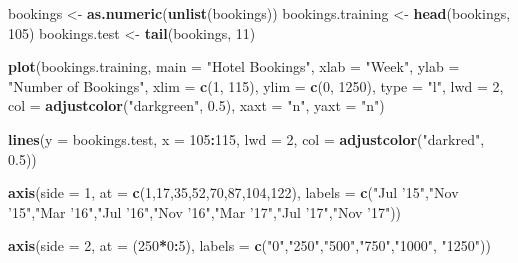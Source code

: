 \documentclass[]{article}
\newenvironment{Shaded}{\begin{snugshade}}{\end{snugshade}}
\newcommand{\DataTypeTok}[1]{\textcolor[rgb]{0.13,0.29,0.53}{#1}}
\newcommand{\DecValTok}[1]{\textcolor[rgb]{0.00,0.00,0.81}{#1}}
\newcommand{\FloatTok}[1]{\textcolor[rgb]{0.00,0.00,0.81}{#1}}
\newcommand{\KeywordTok}[1]{\textcolor[rgb]{0.13,0.29,0.53}{\textbf{#1}}}
\newcommand{\NormalTok}[1]{#1}
\newcommand{\OperatorTok}[1]{\textcolor[rgb]{0.81,0.36,0.00}{\textbf{#1}}}
\newcommand{\StringTok}[1]{\textcolor[rgb]{0.31,0.60,0.02}{#1}}
\begin{document}
\begin{Shaded}
\begin{Highlighting}[]
\NormalTok{bookings <-}\StringTok{ }\KeywordTok{as.numeric}\NormalTok{(}\KeywordTok{unlist}\NormalTok{(bookings))}
\NormalTok{bookings.training <-}\StringTok{ }\KeywordTok{head}\NormalTok{(bookings, }\DecValTok{105}\NormalTok{)}
\NormalTok{bookings.test <-}\StringTok{ }\KeywordTok{tail}\NormalTok{(bookings, }\DecValTok{11}\NormalTok{)}

\KeywordTok{plot}\NormalTok{(bookings.training,}
     \DataTypeTok{main =} \StringTok{"Hotel Bookings"}\NormalTok{,}
     \DataTypeTok{xlab =} \StringTok{"Week"}\NormalTok{,}
     \DataTypeTok{ylab =} \StringTok{"Number of Bookings"}\NormalTok{,}
     \DataTypeTok{xlim =} \KeywordTok{c}\NormalTok{(}\DecValTok{1}\NormalTok{, }\DecValTok{115}\NormalTok{),}
     \DataTypeTok{ylim =} \KeywordTok{c}\NormalTok{(}\DecValTok{0}\NormalTok{, }\DecValTok{1250}\NormalTok{),}
     \DataTypeTok{type =} \StringTok{"l"}\NormalTok{,}
     \DataTypeTok{lwd =} \DecValTok{2}\NormalTok{,}
     \DataTypeTok{col =} \KeywordTok{adjustcolor}\NormalTok{(}\StringTok{"darkgreen"}\NormalTok{, }\FloatTok{0.5}\NormalTok{),}
     \DataTypeTok{xaxt =} \StringTok{"n"}\NormalTok{,}
     \DataTypeTok{yaxt =} \StringTok{"n"}\NormalTok{)}

\KeywordTok{lines}\NormalTok{(}\DataTypeTok{y =}\NormalTok{ bookings.test,}
      \DataTypeTok{x =} \DecValTok{105}\OperatorTok{:}\DecValTok{115}\NormalTok{,}
      \DataTypeTok{lwd =} \DecValTok{2}\NormalTok{,}
      \DataTypeTok{col =} \KeywordTok{adjustcolor}\NormalTok{(}\StringTok{"darkred"}\NormalTok{, }\FloatTok{0.5}\NormalTok{))}

\KeywordTok{axis}\NormalTok{(}\DataTypeTok{side =} \DecValTok{1}\NormalTok{, }\DataTypeTok{at =} \KeywordTok{c}\NormalTok{(}\DecValTok{1}\NormalTok{,}\DecValTok{17}\NormalTok{,}\DecValTok{35}\NormalTok{,}\DecValTok{52}\NormalTok{,}\DecValTok{70}\NormalTok{,}\DecValTok{87}\NormalTok{,}\DecValTok{104}\NormalTok{,}\DecValTok{122}\NormalTok{),}
     \DataTypeTok{labels =} \KeywordTok{c}\NormalTok{(}\StringTok{"Jul '15"}\NormalTok{,}\StringTok{"Nov '15"}\NormalTok{,}\StringTok{"Mar '16"}\NormalTok{,}\StringTok{"Jul '16"}\NormalTok{,}\StringTok{"Nov '16"}\NormalTok{,}\StringTok{"Mar '17"}\NormalTok{,}\StringTok{"Jul '17"}\NormalTok{,}\StringTok{"Nov '17"}\NormalTok{))}

\KeywordTok{axis}\NormalTok{(}\DataTypeTok{side =} \DecValTok{2}\NormalTok{, }\DataTypeTok{at =}\NormalTok{ (}\DecValTok{250}\OperatorTok{*}\DecValTok{0}\OperatorTok{:}\DecValTok{5}\NormalTok{), }\DataTypeTok{labels =} \KeywordTok{c}\NormalTok{(}\StringTok{"0"}\NormalTok{,}\StringTok{"250"}\NormalTok{,}\StringTok{"500"}\NormalTok{,}\StringTok{"750"}\NormalTok{,}\StringTok{"1000"}\NormalTok{, }\StringTok{"1250"}\NormalTok{))}


\end{Highlighting}
\end{Shaded}
\end{document}
